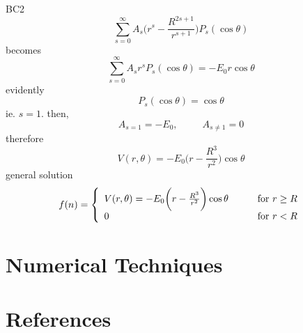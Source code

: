 \documentclass[a4paper]{jpconf}
\begin{document}
BC2
\begin{equation}
\sum_{s=0}^{\infty} A_s \bigg(r^s - \frac{R^{2s+1}}{r^{s+1}}\bigg) P_s (\cos \theta)
\end{equation}
becomes
\begin{equation}
\sum_{s=0}^{\infty} A_s r^s P_s(\cos \theta) = -E_0 r \cos \theta
\end{equation}
evidently
\begin{equation}
P_s (\cos \theta) = \cos \theta 
\end{equation}
ie. $s=1$. then, 
\begin{equation}
A_{s=1} = - E_0, \hspace{30pt} A_{s \neq 1} = 0
\end{equation}
therefore
\begin{equation}
V(r,\theta) = -E_0 \bigg(r - \frac{R^3}{r^2}\bigg) \cos \theta
\end{equation}
general solution
\begin{equation}
f(n) = \left\{ 
  \begin{array}{l l}
   V(r,\theta) = -E_0 \bigg(r - \frac{R^3}{r^2}\bigg) \cos \theta  & \qquad \text{for $r \geq R$}\\
    0 & \qquad \text{for $r < R$}
  \end{array} \right.
\end{equation}
\section*{Numerical Techniques}

\section*{References}


\end{document}
